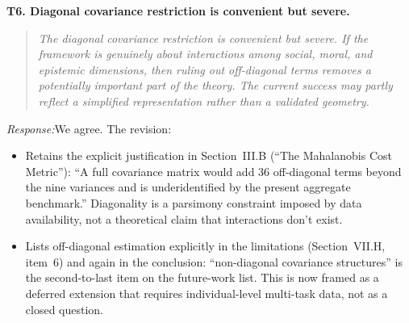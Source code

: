 \documentclass[11pt]{article}
\newcommand{\rev}[1]{\textbf{#1}}
\newcommand{\resp}{\medskip\noindent\emph{Response:}\quad}
\begin{document}
\rev{T6. Diagonal covariance restriction is convenient but severe.}
\begin{quote}\itshape\small
The diagonal covariance restriction is convenient but severe. If the framework is genuinely about interactions among social, moral, and epistemic dimensions, then ruling out off-diagonal terms removes a potentially important part of the theory. The current success may partly reflect a simplified representation rather than a validated geometry.
\end{quote}
\resp We agree. The revision:
\begin{itemize}[leftmargin=*]
  \item Retains the explicit justification in Section~III.B (``The Mahalanobis Cost
        Metric''): ``A full covariance matrix would add 36 off-diagonal terms beyond
        the nine variances and is underidentified by the present aggregate benchmark.''
        Diagonality is a parsimony constraint imposed by data availability, not a
        theoretical claim that interactions don't exist.
  \item Lists off-diagonal estimation explicitly in the limitations (Section~VII.H,
        item~6) and again in the conclusion: ``non-diagonal covariance structures'' is
        the second-to-last item on the future-work list. This is now framed as a deferred
        extension that requires individual-level multi-task data, not as a closed
        question.
\end{itemize}
\end{document}

